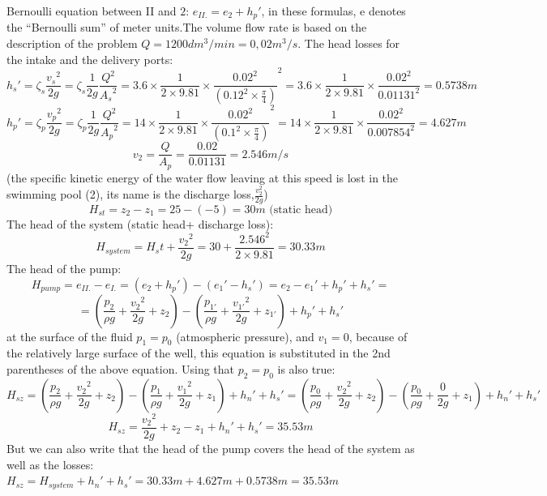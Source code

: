\begin{tcolorbox}
Bernoulli equation between II and $2$: $e_{II.}=e_2+{h_p}'$, in these formulas, e denotes the “Bernoulli sum” of meter units.The volume flow rate is based on the description of the problem $Q = 1200dm^3/min = 0,02m^3/s$. The head losses for the intake and the delivery ports:
\begin{equation*}
{h_s}'=\zeta_s \frac{{v_s}^2}{2g}=\zeta_s \frac{1}{2g}\frac{Q^2}{{A_s}^2}=3.6\times\frac{1}{2\times 9.81}\times\frac{0.02^2}{\left(0.12^2\times\frac{\pi}{4}\right)}^2=3.6\times\frac{1}{2\times 9.81}\times\frac{0.02^2}{0.01131^2}=0.5738m	
\end{equation*}
\begin{equation*}
{h_p}'=\zeta_p \frac{{v_p}^2}{2g}=\zeta_p \frac{1}{2g}\frac{Q^2}{{A_p}^2}=14\times\frac{1}{2\times 9.81}\times\frac{0.02^2}{\left(0.1^2\times\frac{\pi}{4}\right)}^2=14\times\frac{1}{2\times 9.81}\times\frac{0.02^2}{0.007854^2}=4.627m	
\end{equation*}
\begin{equation*}
v_2=\frac{Q}{A_p}=\frac{0.02}{0.01131}=2.546 m/s	
\end{equation*}
(the specific kinetic energy of the water flow leaving at this speed is lost in the swimming pool (2), its name is the discharge loss,$\frac{v_2^2}{2g}$)
\begin{equation*}
H_{st}=z_2-z_1=25-(-5)=30m \text{  (static head)}	
\end{equation*}
The head of the system (static head+ discharge loss):
\begin{equation*}
H_{system}=H_st+\frac{{v_2}^2}{2g}=30+\frac{2.546^2}{2\times 9.81}=30.33m
\end{equation*}
The head of the pump:
\begin{equation*}
	H_{pump}=e_{II.}-e_{I.}=(e_2+{h_p}')-({e_1}'-{h_s}')=e_2-{e_1}'+{h_p}'+{h_s}'=
\end{equation*}
\begin{equation*}
=\left(\frac{p_2}{\rho g}+\frac{{v_2}^2}{2g}+z_2\right)-\left(\frac{p_{1'}}{\rho g}+\frac{{v_{1'}}^2}{2g}+z_{1'}\right)+{h_p}'+{h_s}'
\end{equation*}
at the surface of the fluid $p_1 = p_0$ (atmospheric pressure), and $v_1 = 0$, because of the relatively large surface of the well, this equation is substituted in the 2nd parentheses of the above equation.
Using that $p_2 = p_0$ is also true:
\begin{equation*}
	H_{sz}=\left(\frac{p_2}{\rho g}+\frac{{v_2}^2}{2g}+z_2\right)-\left(\frac{p_1}{\rho g}+\frac{{v_{1}}^2}{2g}+z_1 \right)+{h_n}'+{h_s}'=\left(\frac{p_0}{\rho g}+\frac{{v_2}^2}{2g}+z_2\right)-\left(\frac{p_{0}}{\rho g}+\frac{0}{2g}+z_1\right)+{h_n}'+{h_s}' 
	\end{equation*}
\begin{equation*}
H_{sz}=\frac{{v_2}^2}{2g}+z_2-z_1+{h_n}'+{h_s}'=35.53m
\end{equation*}
But we can also write that the head of the pump covers the head of the system as well as the losses: $H_{sz}=H_{system}+{h_n}'+{h_s}'=30.33m+4.627m+0.5738m=35.53m$
\end{tcolorbox}

